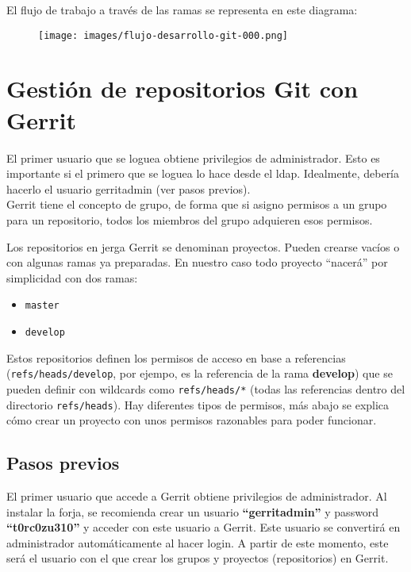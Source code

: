 El flujo de trabajo a través de las ramas se representa en este
diagrama:

\begin{figure}[htbp]
\centering
\texttt{[image: images/flujo-desarrollo-git-000.png]}
\caption{}
\end{figure}

\section{Gestión de repositorios Git con Gerrit}

El primer usuario que se loguea obtiene privilegios de administrador.
Esto es importante si el primero que se loguea lo hace desde el ldap.
Idealmente, debería hacerlo el usuario gerritadmin (ver pasos
previos).\\Gerrit tiene el concepto de grupo, de forma que si asigno
permisos a un grupo para un repositorio, todos los miembros del grupo
adquieren esos permisos.

Los repositorios en jerga Gerrit se denominan proyectos. Pueden crearse
vacíos o con algunas ramas ya preparadas. En nuestro caso todo proyecto
``nacerá'' por simplicidad con dos ramas:

\begin{itemize}
\item
  \texttt{master}
\item
  \texttt{develop}
\end{itemize}
Estos repositorios definen los permisos de acceso en base a referencias
(\texttt{refs/heads/develop}, por ejempo, es la referencia de la rama
\textbf{develop}) que se pueden definir con wildcards como
\texttt{refs/heads/*} (todas las referencias dentro del directorio
\texttt{refs/heads}). Hay diferentes tipos de permisos, más abajo se
explica cómo crear un proyecto con unos permisos razonables para poder
funcionar.

\subsection{Pasos previos}

El primer usuario que accede a Gerrit obtiene privilegios de
administrador. Al instalar la forja, se recomienda crear un usuario
\textbf{``gerritadmin''} y password \textbf{``t0rc0zu310''} y acceder
con este usuario a Gerrit. Este usuario se convertirá en administrador
automáticamente al hacer login. A partir de este momento, este será el
usuario con el que crear los grupos y proyectos (repositorios) en
Gerrit.


